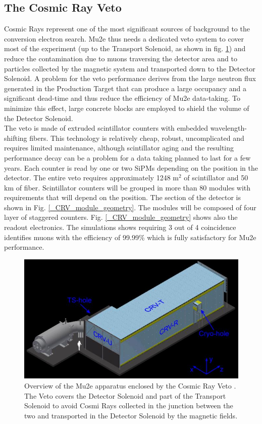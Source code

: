 \documentclass[12pt,a4paper,openright, oneside, titlepage]{book} %
\begin{document}
\subsection{The Cosmic Ray Veto}
Cosmic Rays represent one of the most significant sources of background to the conversion electron search.
Mu2e thus needs a dedicated veto system \cite{CRV:2019} to cover most of the experiment (up to the Transport Solenoid, as shown in fig. \ref{_CRV}) and reduce the contamination due to muons traversing the detector area and to particles collected by the magnetic system and transported down to the Detector Solenoid. 
A problem for the veto performance derives from the large neutron flux generated in the Production Target that can produce a large occupancy and a significant dead-time and thus reduce the efficiency of Mu2e data-taking. 
To minimize this effect, large concrete blocks are employed to shield the volume of the Detector Solenoid.\\
The veto is made of extruded scintillator counters with embedded wavelength-shifting fibers.
This technology is relatively cheap, robust, uncomplicated and requires limited maintenance, although scintillator aging and the resulting performance decay can be a problem for a data taking planned to last for a few years.
Each counter is read by one or two SiPMs depending on the position in the detector. 
The entire veto requires approximately 1248 m$^2$ of scintillator and 50 km of fiber. 
Scintillator counters will be grouped in more than 80 modules with requirements that will depend on the position.
The section of the detector is shown in Fig. \ref{_CRV_module_geometry}.
The modules will be composed of four layer of staggered counters. 
Fig. \ref{_CRV_module_geometry} shows also the readout electronics. 
The simulations shows requiring 3 out of 4 coincidence identifies muons with the efficiency of 99.99\% which is fully satisfactory for Mu2e performance.


\begin{figure}[h!]
\centering
\includegraphics[scale=1.8]{CRV}
\caption[Cosmic Rays Veto system]{Overview of the Mu2e apparatus enclosed by the Cosmic Ray Veto \cite{CRV:2019}. 
The Veto covers the Detector Solenoid and part of the Transport Solenoid to avoid Cosmi Rays collected in the junction between the two and transported in the Detector Solenoid by the magnetic fields.}
\label{_CRV}
\end{figure}
\end{document}
